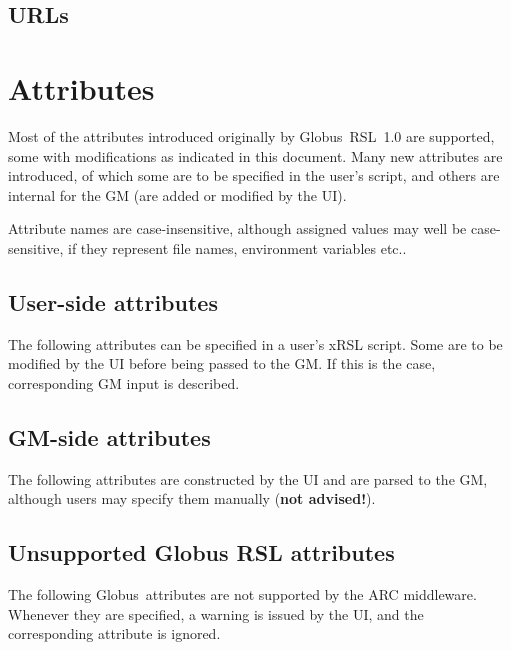 \documentclass{book}
\newcommand{\globus}{Globus\textsuperscript{\textregistered}}
\begin{document}
  \section{URLs}
  \label{sec:url}

  

  \chapter{Attributes}
  \label{sec:attributes}

  Most of the attributes  introduced originally by \globus\ RSL~1.0 are
  supported, some with modifications as indicated in this
  document. Many new attributes are introduced, of which some are
  to be specified in the user's script, and others are internal for
  the GM (are added or modified by the UI).

  Attribute names are case-insensitive, although assigned values may
  well be case-sensitive, if they represent file names, environment
  variables etc..

  \section{User-side attributes}
  \label{sec:user}

  The following attributes  can be
  specified in a user's xRSL script. Some are to be modified by the UI
  before being passed to the GM. If this is the case, corresponding GM input is described.

  

  \section{GM-side attributes}
  \label{sec:gm}

  The following attributes are constructed by the UI and are parsed to
  the GM, although users may specify them manually (\textbf{not
  advised!}).

  

  \section{Unsupported Globus RSL attributes}
  \label{sec:globus}

  The following \globus\ attributes are not supported by the ARC
  middleware. Whenever they are specified, a warning is issued by the
  UI, and the corresponding attribute is ignored.
\end{document}
